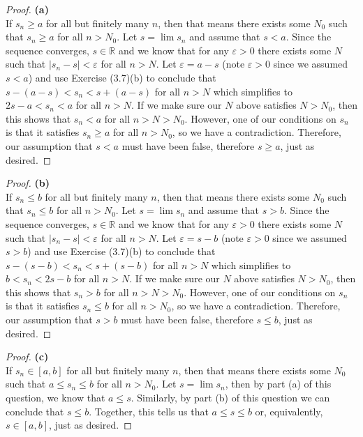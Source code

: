 \documentclass[10pt,a4paper]{article}
\theoremstyle{definition}
\begin{document}
\begin{proof}{\textbf{(a)}}
\\If $s_n \geq a$ for all but finitely many $n$, then that means there exists some $N_0$ such that $s_n \geq a$ for all $n > N_0$. Let $s = \lim s_n$ and assume that $s < a$. Since the sequence converges, $s \in \mathbb{R}$ and we know that for any $\varepsilon > 0$ there exists some $N$ such that $|s_n - s| < \varepsilon$ for all $n > N$. Let $\varepsilon = a - s$ (note $\varepsilon > 0$ since we assumed $s < a$) and use Exercise (3.7)(b) to conclude that $s - (a - s) < s_n < s + (a - s)$ for all $n > N$ which simplifies to $2s - a < s_n < a$ for all $n > N$. If we make sure our $N$ above satisfies $N > N_0$, then this shows that $s_n < a$ for all $n > N > N_0$. However, one of our conditions on $s_n$ is that it satisfies $s_n \geq a$ for all $n > N_0$, so we have a contradiction. Therefore, our assumption that $s < a$ must have been false, therefore $s \geq a$, just as desired. 
\end{proof}

\begin{proof}{\textbf{(b)}}
\\If $s_n \leq b$ for all but finitely many $n$, then that means there exists some $N_0$ such that $s_n \leq b$ for all $n > N_0$. Let $s = \lim s_n$ and assume that $s > b$. Since the sequence converges, $s \in \mathbb{R}$ and we know that for any $\varepsilon > 0$ there exists some $N$ such that $|s_n - s| < \varepsilon$ for all $n > N$. Let $\varepsilon = s - b$ (note $\varepsilon > 0$ since we assumed $s > b$) and use Exercise (3.7)(b) to conclude that $s - (s - b) < s_n < s + (s - b)$ for all $n > N$ which simplifies to $b < s_n < 2s - b$ for all $n > N$. If we make sure our $N$ above satisfies $N > N_0$, then this shows that $s_n > b$ for all $n > N > N_0$. However, one of our conditions on $s_n$ is that it satisfies $s_n \leq b$ for all $n > N_0$, so we have a contradiction. Therefore, our assumption that $s > b$ must have been false, therefore $s \leq b$, just as desired. 
\end{proof}

\begin{proof}{\textbf{(c)}}
\\If $s_n \in [a, b]$ for all but finitely many $n$, then that means there exists some $N_0$ such that $a \leq s_n \leq b$ for all $n > N_0$. Let $s = \lim s_n$, then by part (a) of this question, we know that $a \leq s$. Similarly, by part (b) of this question we can conclude that $s \leq b$. Together, this tells us that $a \leq s \leq b$ or, equivalently, $s \in [a, b]$, just as desired. 
\end{proof}
\end{document}
